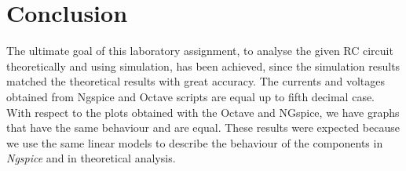 \section{Conclusion}
\label{sec:conclusion}


The ultimate goal of this laboratory assignment, to analyse
the given RC circuit theoretically and using simulation, has been achieved, 
since the simulation results matched the theoretical results with 
great accuracy. The currents and voltages obtained from  Ngspice
and Octave scripts are equal up to fifth decimal case.
With respect to the plots obtained with the Octave and NGspice, we 
have graphs that have the same behaviour and are equal.
These results were expected because we use the same linear models to
describe the behaviour of the components in \textit{Ngspice} and in
theoretical analysis.


